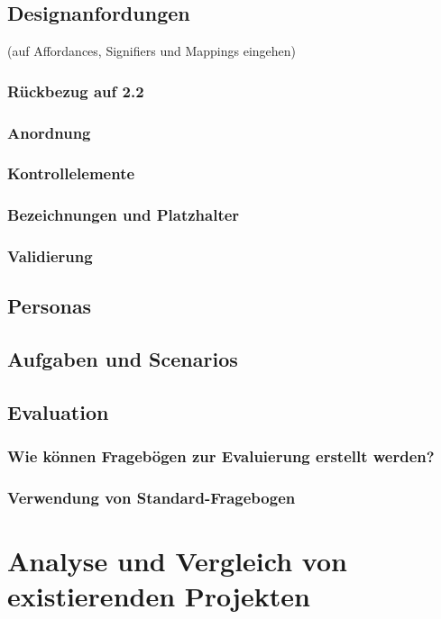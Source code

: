 \documentclass[a4paper, 12pt, oneside, BCOR=1cm,toc=chapterentrywithdots]{scrbook}
\begin{document}
\subsection{Designanfordungen}
\cite{normanDesignEveryday2013} (auf Affordances, Signifiers und Mappings eingehen)
\subsubsection{Rückbezug auf 2.2}
\subsubsection{Anordnung}
\subsubsection{Kontrollelemente}
\subsubsection{Bezeichnungen und Platzhalter}
\subsubsection{Validierung}

\clearpage



\subsection{Personas}
\subsection{Aufgaben und Scenarios}
\subsection{Evaluation}
\subsubsection{Wie können Fragebögen zur Evaluierung erstellt werden?}
\subsubsection{Verwendung von Standard-Fragebogen}

\section{Analyse und Vergleich von existierenden Projekten}
\end{document}
